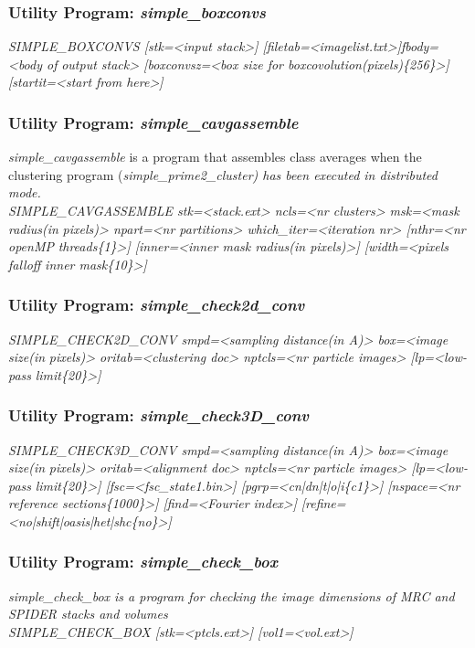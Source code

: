 \documentclass[review]{elsarticle}
\begin{document}
\subsubsection{Utility Program: {\it{simple\_boxconvs}}}
\label{boxconvs}
{\it{SIMPLE\_BOXCONVS [stk=<input stack>] [filetab=<imagelist.txt>]fbody=<body of}}
{\it{output stack> [boxconvsz=<box size for boxcovolution(pixels)\{256\}>]}}
{\it{[startit=<start from here>]}}

\subsubsection{Utility Program: {\it{simple\_cavgassemble}}}
\label{cavgassemble}
{\it{simple\_cavgassemble}} is a program that assembles class averages when the clustering program ({\it{simple\_prime2\_cluster}) has been executed in distributed mode.}\\
{\it{SIMPLE\_CAVGASSEMBLE stk=<stack.ext> ncls=<nr clusters> msk=<mask radius(in}}
{\it{pixels)> npart=<nr partitions> which\_iter=<iteration nr> [nthr=<nr openMP}}
{\it{threads\{1\}>] [inner=<inner mask radius(in pixels)>] [width=<pixels falloff}}
{\it{inner mask\{10\}>]}}

\subsubsection{Utility Program: {\it{simple\_check2d\_conv}}}
\label{check2d_conv}
{\it{SIMPLE\_CHECK2D\_CONV smpd=<sampling distance(in A)> box=<image size(in}}
{\it{pixels)> oritab=<clustering doc> nptcls=<nr particle images> [lp=<low-pass}}
{\it{limit\{20\}>]}}

\subsubsection{Utility Program: {\it{simple\_check3D\_conv}}}
\label{check3D_conv}
{\it{SIMPLE\_CHECK3D\_CONV smpd=<sampling distance(in A)> box=<image size(in}}
{\it{pixels)> oritab=<alignment doc> nptcls=<nr particle images> [lp=<low-pass}}
{\it{limit\{20\}>] [fsc=<fsc\_state1.bin>] [pgrp=<cn|dn|t|o|i\{c1\}>] [nspace=<nr}}
{\it{reference sections\{1000\}>] [find=<Fourier index>]}}
{\it{[refine=<no|shift|oasis|het|shc\{no\}>]}}

\subsubsection{Utility Program: {\it{simple\_check\_box}}}
\label{check_box}
{\it{simple\_check\_box} is a program for checking the image dimensions of MRC and SPIDER stacks and volumes\\}
{\it{SIMPLE\_CHECK\_BOX [stk=<ptcls.ext>] [vol1=<vol.ext>]}}
\end{document}
